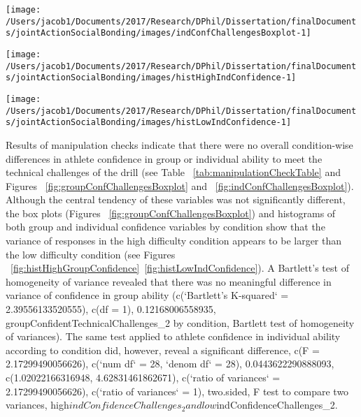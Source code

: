 \documentclass[english]{article}\usepackage[]{graphicx}\usepackage[]{color}
\makeatletter
\def\maxwidth{ %
  \ifdim\Gin@nat@width>\linewidth
    \linewidth
  \else
    \Gin@nat@width
  \fi
}
\newenvironment{knitrout}{}{} %
\makeatother
\begin{document}
\begin{knitrout}
\color{fgcolor}

{\centering \texttt{[image: /Users/jacob1/Documents/2017/Research/DPhil/Dissertation/finalDocuments/jointActionSocialBonding/images/indConfChallengesBoxplot-1]} 

}



\end{knitrout}

\begin{knitrout}
\color{fgcolor}

{\centering \texttt{[image: /Users/jacob1/Documents/2017/Research/DPhil/Dissertation/finalDocuments/jointActionSocialBonding/images/histHighIndConfidence-1]} 

}



\end{knitrout}

\begin{knitrout}
\color{fgcolor}

{\centering \texttt{[image: /Users/jacob1/Documents/2017/Research/DPhil/Dissertation/finalDocuments/jointActionSocialBonding/images/histLowIndConfidence-1]} 

}



\end{knitrout}


Results of manipulation checks indicate that there were no overall condition-wise differences in athlete confidence in group or individual ability to meet the technical challenges of the drill (see Table ~\ref{tab:manipulationCheckTable} and Figures ~\ref{fig:groupConfChallengesBoxplot} and ~\ref{fig:indConfChallengesBoxplot}).
Although the central tendency of these variables was not significantly different, the box plots (Figures ~\ref{fig:groupConfChallengesBoxplot}) and histograms of both group and individual confidence variables by condition show that the variance of responses in the high difficulty condition appears to be larger than the low difficulty condition (see Figures ~\ref{fig:histHighGroupConfidence}\nobreakdash~\ref{fig:histLowIndConfidence}).
A Bartlett's test of homogeneity of variance revealed that there was no meaningful difference in variance of confidence in group ability (c(`Bartlett's K-squared` = 2.39556133520555), c(df = 1), 0.12168006558935, groupConfidentTechnicalChallenges_2 by condition, Bartlett test of homogeneity of variances). The same test applied to athlete confidence in individual ability according to condition did, however, reveal a significant difference, c(F = 2.17299490056626), c(`num df` = 28, `denom df` = 28), 0.0443622290888093, c(1.02022166316948, 4.62831461862671), c(`ratio of variances` = 2.17299490056626), c(`ratio of variances` = 1), two.sided, F test to compare two variances, high$indConfidenceChallenges_2 and low$indConfidenceChallenges_2.
\end{document}
